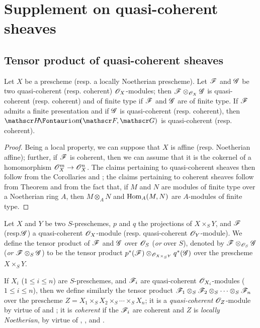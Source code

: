 \section{Supplement on quasi-coherent sheaves}
\label{section:supplement-on-qcoh}

\subsection{Tensor product of quasi-coherent sheaves}
\label{subsection:tensor-product-of-qcoh}

\begin{prop}[9.1.1]
\label{1.9.1.1}
Let $X$ be a prescheme (resp. a locally Noetherian prescheme). Let $\mathscr{F}$ and
$\mathscr{G}$ be two quasi-coherent (resp. coherent) $\mathscr{O}_X$-modules; then
$\mathscr{F}\otimes_{\mathscr{O}_X}\mathscr{G}$ is quasi-coherent (resp. coherent) and
of finite type if $\mathscr{F}$ and $\mathscr{G}$ are of finite type. If
$\mathscr{F}$ admits a finite presentation and if $\mathscr{G}$ is quasi-coherent
(resp. coherent), then $\shHom(\sh{F},\sh{G})$ is quasi-coherent
(resp. coherent).
\end{prop}

\begin{proof}
\label{proof-1.9.1.1}
Being a local property, we can suppose that $X$ is affine (resp. Noetherian
affine); further, if $\mathscr{F}$ is coherent, then we can assume that it is the
cokernel of a homomorphism $\OO_X^m\to\OO_X^n$. The claims pertaining to
quasi-coherent sheaves then follow from the Corollaries  and ; the
claims pertaining to coherent sheaves follow from Theorem  and from the fact
that, if $M$ and $N$ are modules of finite type over a Noetherian ring $A$,
then $M\otimes_A N$ and ${\mathop{\mathrm{Hom}}\nolimits}_A(M,N)$ are $A$-modules of finite type.
\end{proof}

\begin{defn}[9.1.2]
\label{1.9.1.2}
Let $X$ and $Y$ be two $S$-preschemes, $p$ and
$q$ the projections of $X\times_S Y$, and $\mathscr{F}$ (resp.$\mathscr{G}$) a
quasi-coherent $\mathscr{O}_X$-module (resp. quasi-coherent $\mathscr{O}_Y$-module). We define the
tensor product of $\mathscr{F}$ and $\mathscr{G}$ over $\mathscr{O}_S$ (\emph{or} over $S$),
denoted by $\mathscr{F}\otimes_{\mathscr{O}_S}\mathscr{G}$ (\emph{or}
$\mathscr{F}\otimes_S\mathscr{G}$) to be the tensor product
$p^*(\mathscr{F})\otimes_{\mathscr{O}_{X\times_S Y}}q^*(\mathscr{G})$ over the
prescheme $X\times_S Y$.
\end{defn}

If $X_i$ ($1\leq i\leq n$) are $S$-preschemes, and $\mathscr{F}_i$ are quasi-coherent
$\mathscr{O}_{X_i}$-modules ($1\leq i\leq n$), then we define similarly the tensor product
$\mathscr{F}_1\otimes_S\mathscr{F}_2\otimes_S\cdots\otimes_S\mathscr{F}_n$ over the
prescheme $Z=X_1\times_S X_2\times_S\cdots\times_S X_n$; it is a
\emph{quasi-coherent} $\mathscr{O}_Z$-module by virtue of  and
; it is \emph{coherent} if the $\mathscr{F}_i$ are coherent and
$Z$ is \emph{locally Noetherian}, by virtue of ,
, and .

